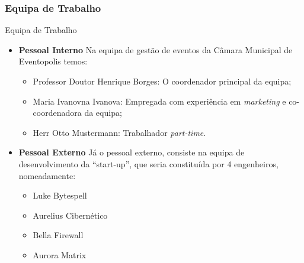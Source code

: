\documentclass[compress,svgnames,handout,13.7pt]{beamer}
\begin{document}
\subsubsection{Equipa de Trabalho}
\begin{frame}{Equipa de Trabalho}
\begin{itemize}
                 \item{\textbf{Pessoal Interno}}
                   Na equipa de gest\~ao de eventos da C\^amara Municipal de Eventopolis temos:
                   \begin{itemize}
                     \item{Professor Doutor Henrique Borges:} O coordenador principal da equipa;
                     \item{Maria Ivanovna Ivanova:} Empregada com experi\^encia em \textit{marketing} e co-coordenadora
                       da equipa;
                     \item{Herr Otto Mustermann:} Trabalhador \textit{part-time}.
                   \end{itemize}
                 \item{\textbf{Pessoal Externo}}
                   Já o pessoal externo, consiste na equipa de desenvolvimento da ``start-up'',
                   que seria constituída por 4 engenheiros, nomeadamente:
                   \begin{itemize}
                     \item Luke Bytespell
                     \item Aurelius Cibern\'etico
                     \item Bella Firewall
                     \item Aurora Matrix
                   \end{itemize}
             \end{itemize}
\end{frame}
\end{document}
